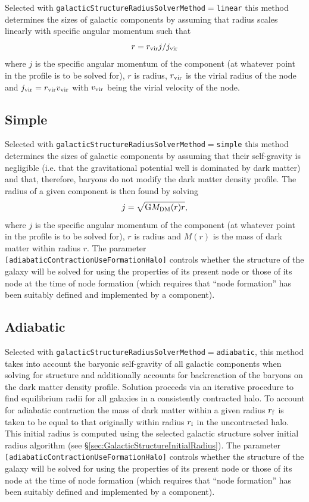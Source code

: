 Selected with {\tt galacticStructureRadiusSolverMethod}$=${\tt linear} this method determines the sizes of galactic components by assuming that radius scales linearly with specific angular momentum such that
\begin{equation}
 r = r_{\rm vir} j/j_{\rm vir}
\end{equation}
where $j$ is the specific angular momentum of the \gls{component} (at whatever point in the profile is to be solved for), $r$ is radius, $r_{\rm vir}$ is the virial radius of the \gls{node} and $j_{\rm vir}= r_{\rm vir} v_{\rm vir}$ with $v_{\rm vir}$ being the virial velocity of the \gls{node}.

\subsection{Simple}

Selected with {\tt galacticStructureRadiusSolverMethod}$=${\tt simple} this method determines the sizes of galactic components by assuming that their self-gravity is negligible (i.e. that the gravitational potential well is dominated by dark matter) and that, therefore, baryons do not modify the dark matter density profile. The radius of a given \gls{component} is then found by solving
\begin{equation}
 j = \sqrt{\G M_{\rm DM}(r) r},
\end{equation}
where $j$ is the specific angular momentum of the \gls{component} (at whatever point in the profile is to be solved for), $r$ is radius and $M(r)$ is the mass of dark matter within radius $r$. The parameter {\tt [adiabaticContractionUseFormationHalo]} controls whether the structure of the galaxy will be solved for using the properties of its present \gls{node} or those of its \gls{node} at the time of \gls{node} formation (which requires that ``node formation'' has been suitably defined and implemented by a component).

\subsection{Adiabatic}

Selected with {\tt galacticStructureRadiusSolverMethod}$=${\tt adiabatic}, this method takes into account the baryonic self-gravity of all galactic components when solving for structure and additionally accounts for backreaction of the baryons on the dark matter density profile.  Solution proceeds via an iterative procedure to find equilibrium radii for all galaxies in a consistently contracted halo. To account for adiabatic contraction the mass of dark matter within a given radius $r_{\rm f}$ is taken to be equal to that originally within radius $r_{\rm i}$ in the uncontracted halo. This initial radius is computed using the selected galactic structure solver initial radius algorithm (see \S\ref{sec:GalacticStructureInitialRadius}). The parameter {\tt [adiabaticContractionUseFormationHalo]} controls whether the structure of the galaxy will be solved for using the properties of its present \gls{node} or those of its \gls{node} at the time of \gls{node} formation (which requires that ``node formation'' has been suitably defined and implemented by a component).

